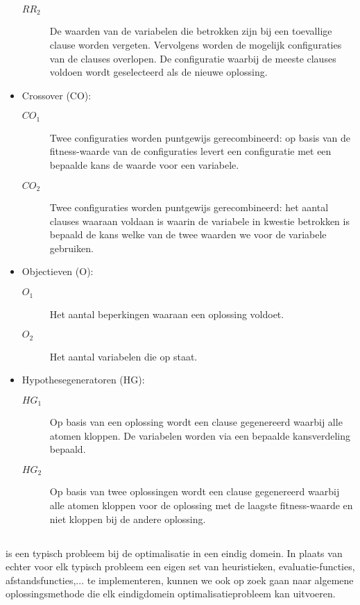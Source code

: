 \begin{itemize}
\begin{description}
 \item [$RR_2$] De waarden van de variabelen die betrokken zijn bij een toevallige clause worden vergeten. Vervolgens worden de mogelijk configuraties van de clauses overlopen. De configuratie waarbij de meeste clauses voldoen wordt geselecteerd als de nieuwe oplossing.
\end{description}
\item Crossover (CO):
\begin{description}
 \item [$CO_1$] Twee configuraties worden puntgewijs gerecombineerd: op basis van de fitness-waarde van de configuraties levert een configuratie met een bepaalde kans de waarde voor een variabele.
 \item [$CO_2$] Twee configuraties worden puntgewijs gerecombineerd: het aantal clauses waaraan voldaan is waarin de variabele in kwestie betrokken is bepaald de kans welke van de twee waarden we voor de variabele gebruiken.
\end{description}
\item Objectieven (O):
\begin{description}
 \item [$O_1$] Het aantal beperkingen waaraan een oplossing voldoet.
 \item [$O_2$] Het aantal variabelen die op \true{} staat.
\end{description}
\item Hypothesegeneratoren (HG):
\begin{description}
 \item [$HG_1$] Op basis van een oplossing wordt een clause gegenereerd waarbij alle atomen kloppen. De variabelen worden via een bepaalde kansverdeling bepaald.
 \item [$HG_2$] Op basis van twee oplossingen wordt een clause gegenereerd waarbij alle atomen kloppen voor de oplossing met de laagste fitness-waarde en niet kloppen bij de andere oplossing.
\end{description}
\end{itemize}


\subsection{}

 is een typisch probleem bij de optimalisatie in een eindig domein. In plaats van echter voor elk typisch probleem een eigen set van heuristieken, evaluatie-functies, afstandsfuncties,... te implementeren, kunnen we ook op zoek gaan naar algemene oplossingsmethode die elk eindigdomein optimalisatieprobleem kan uitvoeren.

